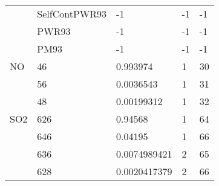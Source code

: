 \begin{longtable}{lllll}
    &SelfContPWR93&             -1      &-1     &-1     \\
    &PWR93&                     -1      &-1     &-1     \\
    &PM93&                      -1      &-1     &-1     \\
\hline                  
  NO& 46&  0.993974&  1&30\\
    & 56&  0.0036543&  1&31\\
    & 48&  0.00199312&  1&32\\
\hline                  
  SO2& 626&  0.94568&  1&64\\
     & 646&  0.04195&  1&66\\
     & 636&  0.0074989421&  2&65\\
     & 628&  0.0020417379&  2&66\\


\end{longtable}
